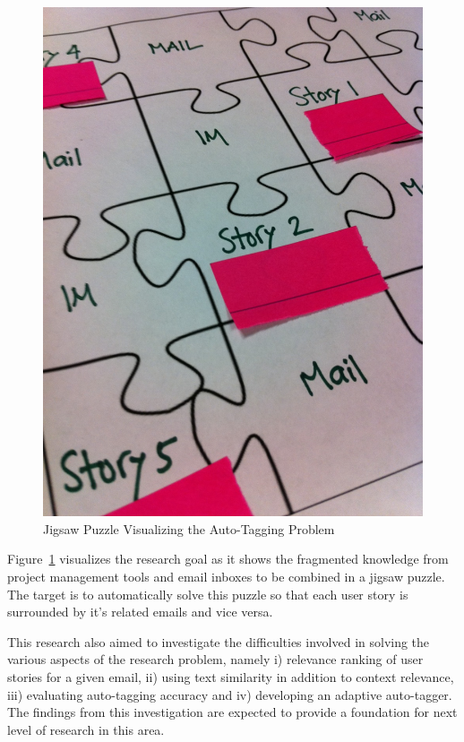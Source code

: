 \begin{figure}[h!]
	\centering
	\includegraphics[width=\textwidth]{Jigsaw.jpg}
    \caption{Jigsaw Puzzle Visualizing the Auto-Tagging Problem}
	\label{fig:jigsaw}
\end{figure}


Figure~\ref{fig:jigsaw} visualizes the research goal as it shows the fragmented knowledge from project management tools and email inboxes to be combined in a jigsaw puzzle. The target is to automatically solve this puzzle so that each user story is surrounded by it's related emails and vice versa.

This research also aimed to investigate the difficulties involved in solving the various aspects of the research problem, namely i) relevance ranking of user stories for a given email, ii) using text similarity in addition to context relevance, iii) evaluating auto-tagging accuracy and iv) developing an adaptive auto-tagger. The findings from this investigation are expected to provide a foundation for next level of research in this area.

